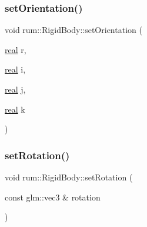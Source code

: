 \mbox{\label{classrum_1_1_rigid_body_a86cae542fe9bde0f917bf8886b8cbb15}} 
\subsubsection{\texorpdfstring{set\+Orientation()}{setOrientation()}\hspace{0.1cm}{\footnotesize\ttfamily [2/2]}}
{\footnotesize\ttfamily void rum\+::\+Rigid\+Body\+::set\+Orientation (\begin{DoxyParamCaption}\item[{\mbox{\hyperlink{namespacerum_a7e8cca23573d5eaead0f138cbaa4862c}{real}}}]{r,  }\item[{\mbox{\hyperlink{namespacerum_a7e8cca23573d5eaead0f138cbaa4862c}{real}}}]{i,  }\item[{\mbox{\hyperlink{namespacerum_a7e8cca23573d5eaead0f138cbaa4862c}{real}}}]{j,  }\item[{\mbox{\hyperlink{namespacerum_a7e8cca23573d5eaead0f138cbaa4862c}{real}}}]{k }\end{DoxyParamCaption})}

\mbox{\label{classrum_1_1_rigid_body_aa6b6e73db8fefb0a54d82cf245b6bda6}} 
\subsubsection{\texorpdfstring{set\+Rotation()}{setRotation()}\hspace{0.1cm}{\footnotesize\ttfamily [1/2]}}
{\footnotesize\ttfamily void rum\+::\+Rigid\+Body\+::set\+Rotation (\begin{DoxyParamCaption}\item[{const glm\+::vec3 \&}]{rotation }\end{DoxyParamCaption})}

\mbox{\label{classrum_1_1_rigid_body_a354acdf9002bcce27ed7d8d51469a06c}} 
